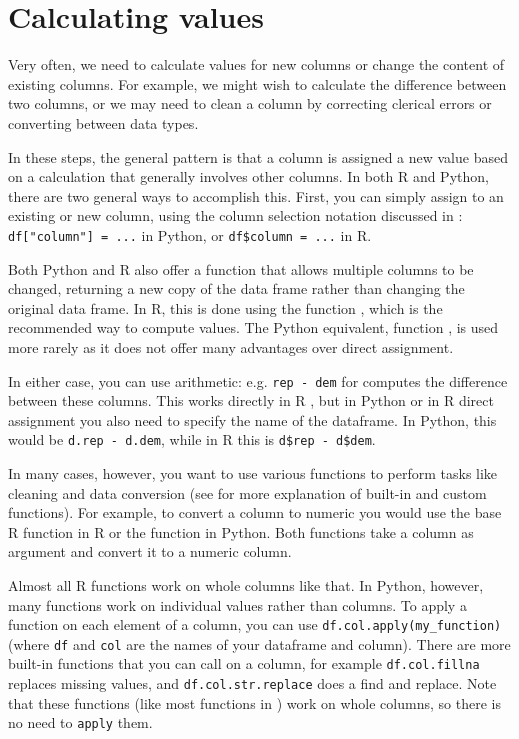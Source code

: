 \section{Calculating values}
\label{sec:calculate}

Very often, we need to calculate values for new columns or change the content of existing columns.
For example, we might wish to calculate the difference between two columns,
or we may need to clean a column by correcting clerical errors or converting between data types.

In these steps, the general pattern is that a column is assigned a new value based on
a calculation that generally involves other columns.
In both R and Python, there are two general ways to accomplish this.
First, you can simply assign to an existing or new column,
using the column selection notation discussed in :
\verb+df["column"] = ...+ in Python, or \verb+df$column = ...+ in R.

Both Python and R also offer a function that allows multiple columns to be changed,
returning a new copy of the data frame rather than changing the original data frame.
In R, this is done using the  function , which is the recommended way to compute values.
The Python equivalent,  function , is used more rarely as it does not offer many advantages over direct assignment.

In either case, you can use arithmetic: e.g. \verb|rep - dem| for computes the difference between these columns.
This works directly in R ,
but in Python or in R direct assignment you also need to specify the name of the dataframe.
In Python, this would be \verb+d.rep - d.dem+, while in R this is \verb+d$rep - d$dem+. 

In many cases, however, you want to use various functions to perform tasks like cleaning and data conversion
(see  for more explanation of built-in and custom functions).
For example, to convert a column to numeric you would use the base R function  in R or the  function  in Python.
Both functions take a column as argument and convert it to a numeric column.

Almost all R functions work on whole columns like that.
In Python, however, many functions work on individual values rather than columns.
To apply a function on each element of a column, you can use \verb+df.col.apply(my_function)+
(where \texttt{df} and \texttt{col} are the names of your dataframe and column). 
There are more built-in functions that you can call on a column, for example \verb+df.col.fillna+ replaces
missing values, and \verb+df.col.str.replace+ does a find and replace.
Note that these functions (like most functions in ) work on whole columns,
so there is no need to \verb+apply+ them. 

